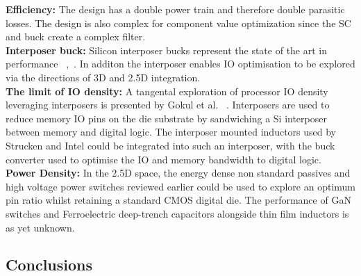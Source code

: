 \documentclass[letterpaper,twocolumn,10pt]{article}
\begin{document}
\textbf{Efficiency: }The design has a double power train and therefore double parasitic losses. The design is also complex for component value optimization since the SC and buck create a complex filter.\\  
\textbf{Interposer buck: }Silicon interposer bucks represent the state of the art in performance ~\cite{Intel2010},~\cite{Sturcken2013}. In additon the interposer enables IO optimisation to be explored via the directions of 3D and 2.5D integration.\\ 
\textbf{The limit of IO density: }A tangental exploration of processor IO density leveraging interposers is presented by Gokul et al. ~\cite{Gokul2011}. Interposers are used to reduce memory IO pins on the die substrate by sandwiching a Si interposer between memory and digital logic. The interposer mounted inductors used by Strucken and Intel could be integrated into such an interposer, with the buck converter used to optimise the IO and memory bandwidth to digital logic.\\
\textbf{Power Density: }In the 2.5D space, the energy dense non standard passives and high voltage power switches reviewed earlier could be used to explore an optimum pin ratio whilst retaining a standard CMOS digital die. The performance of GaN switches and Ferroelectric deep-trench capacitors alongside thin film inductors is as yet unknown.\\        

\subsection{Conclusions}
\end{document}
